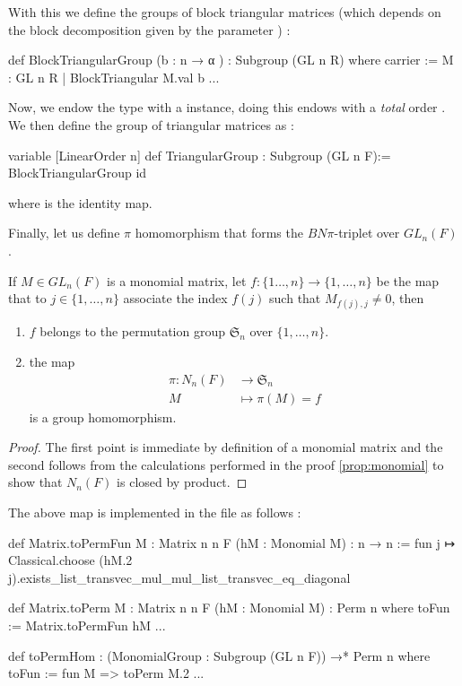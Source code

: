 With this we define the groups of block triangular matrices (which depends on the block decomposition given by the parameter ) :

\begin{leancode}
def BlockTriangularGroup (b : n → α ) : Subgroup (GL n R) where
  carrier :=  {M : GL n R | BlockTriangular M.val b }
  ...
\end{leancode}

Now, we endow the type  with a \lean{[LinearOrder n]} instance, doing this endows  with a \emph{total} order . We then define the group of triangular matrices as : 
\begin{leancode}
variable [LinearOrder n] 
def  TriangularGroup : Subgroup (GL n F):= BlockTriangularGroup id
\end{leancode}
where  is the identity map. 

Finally, let us define $\pi$ homomorphism that forms the $BN\pi$-triplet over $GL_n(F)$.

If $M \in  GL_n\left( F \right)$ is a monomial matrix, let $f : \{1\ldots,n\} \to  \{1,\ldots,n\}$ be the map that to $j \in \{ 1,\ldots,n\}$ associate the index $f(j)$ such that $M_{f(j), j} \neq 0$, then

\begin{lemme}
    \begin{enumerate}
        \item $f$ belongs to the permutation group $\mathfrak{S}_n$ over $\{1,\ldots,n\}$.
        \item the map 
            \begin{align*}
                \pi : N_n\left( F \right) &\longrightarrow \mathfrak{S}_n \\
                M &\longmapsto \pi (M) = f  
            \end{align*} is a group homomorphism.
    \end{enumerate}
\end{lemme}

\begin{proof}
    The first point is immediate by definition of a monomial matrix and the second follows from the calculations performed in the proof \ref{prop:monomial} to show that $N_n\left( F \right)$ is closed by product.
\end{proof}

The above map is implemented in the  file as follows :
\begin{leancode}
def Matrix.toPermFun {M : Matrix n n F} (hM : Monomial M) : n → n :=
  fun j ↦ Classical.choose (hM.2 j).exists_list_transvec_mul_mul_list_transvec_eq_diagonal

def Matrix.toPerm {M : Matrix n n F} (hM : Monomial M) : Perm n where
  toFun := Matrix.toPermFun hM
  ...

def toPermHom : (MonomialGroup : Subgroup (GL n F)) →* Perm n where
  toFun := fun M => toPerm M.2
  ...
\end{leancode}

